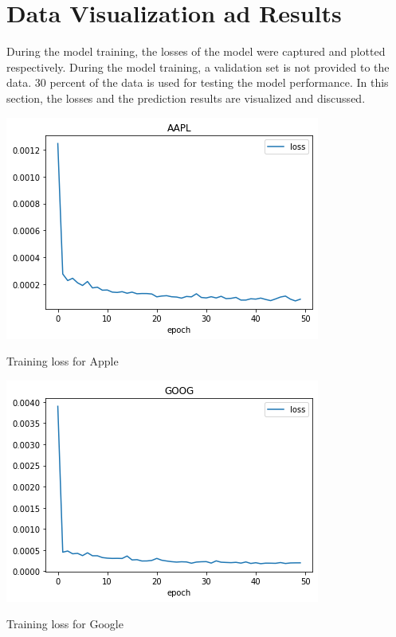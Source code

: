 \section{Data Visualization ad Results}

During the model training, the losses of the model were captured and plotted respectively. During the model training, a validation set is not provided to the data. 30 percent of the data is used for testing the model performance. In this section, the losses and the prediction results are visualized and discussed.

\begin{center}
    \includegraphics[scale=0.50]{loss_AAPL.png}
    \newline
    \caption{Training loss for Apple}
\end{center}

\begin{center}
    \includegraphics[scale=0.50]{loss_GOOG.png}
    \newline
    \caption{Training loss for Google}
\end{center}

